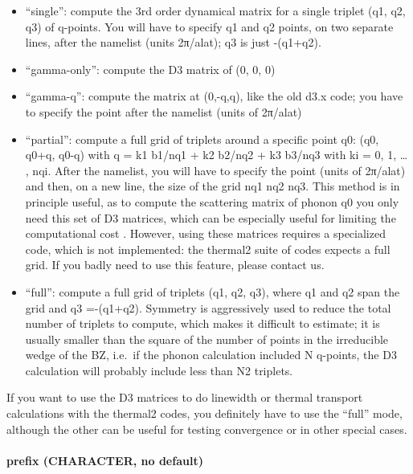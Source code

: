 \documentclass[
]{article}
\providecommand{\tightlist}{%
  \setlength{\itemsep}{0pt}\setlength{\parskip}{0pt}}
\begin{document}
\begin{itemize}
\tightlist
\item
  \enquote{single}: compute the 3rd order dynamical matrix for a single
  triplet (q1, q2, q3) of q-points. You will have to specify q1 and q2
  points, on two separate lines, after the namelist (units 2π/alat); q3
  is just -(q1+q2).
\item
  \enquote{gamma-only}: compute the D3 matrix of (0, 0, 0)
\item
  \enquote{gamma-q}: compute the matrix at (0,-q,q), like the old d3.x
  code; you have to specify the point after the namelist (units of
  2π/alat)
\item
  \enquote{partial}: compute a full grid of triplets around a specific
  point q0: (q0, q0+q, q0-q) with q = k1 b1/nq1 + k2 b2/nq2 + k3 b3/nq3
  with ki = 0, 1, \ldots{} , nqi. After the namelist, you will have to
  specify the point (units of 2π/alat) and then, on a new line, the size
  of the grid nq1 nq2 nq3. This method is in principle useful, as to
  compute the scattering matrix of phonon q0 you only need this set of
  D3 matrices, which can be especially useful for limiting the
  computational cost . However, using these matrices requires a
  specialized code, which is not implemented: the thermal2 suite of
  codes expects a full grid. If you badly need to use this feature,
  please contact us.
\item
  \enquote{full}: compute a full grid of triplets (q1, q2, q3), where q1
  and q2 span the grid and q3 =-(q1+q2). Symmetry is aggressively used
  to reduce the total number of triplets to compute, which makes it
  difficult to estimate; it is usually smaller than the square of the
  number of points in the irreducible wedge of the BZ, i.e.~if the
  phonon calculation included N q-points, the D3 calculation will
  probably include less than N2 triplets.
\end{itemize}

If you want to use the D3 matrices to do linewidth or thermal transport
calculations with the thermal2 codes, you definitely have to use the
\enquote{full} mode, although the other can be useful for testing
convergence or in other special cases.

\hypertarget{prefix-character-no-default}{%
\paragraph{prefix (CHARACTER, no
default)}\label{prefix-character-no-default}}
\end{document}
